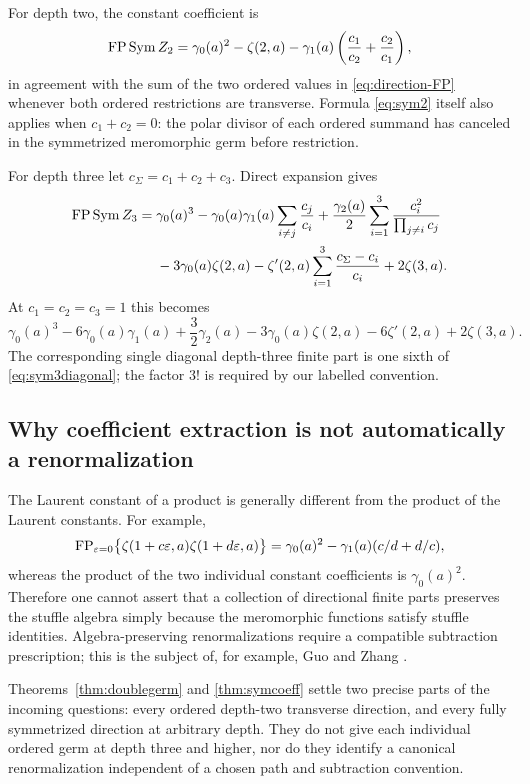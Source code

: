 For depth two, the constant coefficient is
\begin{equation}\label{eq:sym2}
 \operatorname{FP}\operatorname{Sym} Z_2
 =\gamma_0(a)^2-\zeta(2,a)
        -\gamma_1(a)\left(\frac{c_1}{c_2}+\frac{c_2}{c_1}\right),
\end{equation}
in agreement with the sum of the two ordered values in
\eqref{eq:direction-FP} whenever both ordered restrictions are
transverse. Formula \eqref{eq:sym2} itself also applies when
$c_1+c_2=0$: the polar divisor of each ordered summand has canceled
in the symmetrized meromorphic germ before restriction.

For depth three let $c_\Sigma=c_1+c_2+c_3$. Direct expansion gives
\begin{align}\label{eq:sym3}
 \operatorname{FP}\operatorname{Sym} Z_3={}&\gamma_0(a)^3
   -\gamma_0(a)\gamma_1(a)\sum_{i\ne j}\frac{c_j}{c_i}
   +\frac{\gamma_2(a)}2\sum_{i=1}^3
                         \frac{c_i^2}{\prod_{j\ne i}c_j}\notag\\
 &-3\gamma_0(a)\zeta(2,a)
   -\zeta'(2,a)\sum_{i=1}^3\frac{c_\Sigma-c_i}{c_i}
   +2\zeta(3,a).
\end{align}
At $c_1=c_2=c_3=1$ this becomes
\begin{equation}\label{eq:sym3diagonal}
 \gamma_0(a)^3-6\gamma_0(a)\gamma_1(a)+\frac32\gamma_2(a)
 -3\gamma_0(a)\zeta(2,a)-6\zeta'(2,a)+2\zeta(3,a).
\end{equation}
The corresponding single diagonal depth-three finite part is one
sixth of \eqref{eq:sym3diagonal}; the factor $3!$ is required by our
labelled convention.

\subsection{Why coefficient extraction is not automatically a renormalization}

The Laurent constant of a product is generally different from the
product of the Laurent constants. For example,
\begin{equation}\label{eq:FPnonmult}
 \operatorname{FP}_{\varepsilon=0}\bigl\{\zeta(1+c\varepsilon,a)\zeta(1+d\varepsilon,a)\bigr\}
 =\gamma_0(a)^2-\gamma_1(a)(c/d+d/c),
\end{equation}
whereas the product of the two individual constant coefficients is
$\gamma_0(a)^2$. Therefore one cannot assert that a collection of
directional finite parts preserves the stuffle algebra simply because
the meromorphic functions satisfy stuffle identities. Algebra-preserving
renormalizations require a compatible subtraction prescription; this is
the subject of, for example, Guo and Zhang \cite{guozhang}.

Theorems~\ref{thm:doublegerm} and \ref{thm:symcoeff} settle two precise
parts of the incoming questions: every ordered depth-two transverse
direction, and every fully symmetrized direction at arbitrary depth.
They do not give each individual ordered germ at depth three and higher,
nor do they identify a canonical renormalization independent of a chosen
path and subtraction convention.

